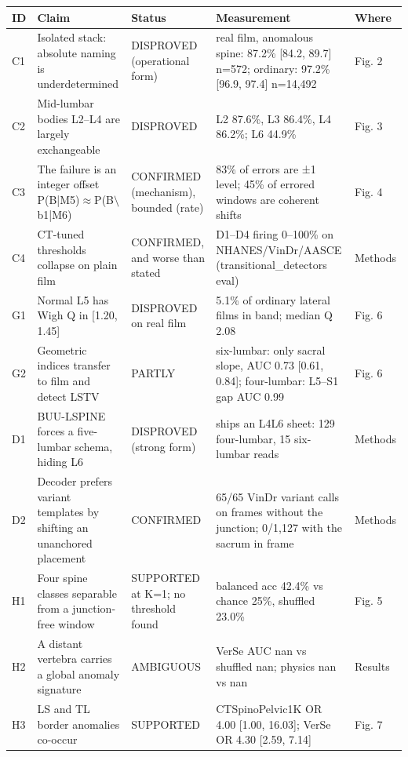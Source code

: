 \begin{tabular}{p{0.6cm}p{4.6cm}p{2.6cm}p{6.2cm}p{1.2cm}}
\toprule
ID & Claim & Status & Measurement & Where \\
\midrule
C1 & Isolated stack: absolute naming is underdetermined & DISPROVED (operational form) & real film, anomalous spine: 87.2\% [84.2, 89.7] n=572; ordinary: 97.2\% [96.9, 97.4] n=14,492 & Fig. 2 \\
C2 & Mid-lumbar bodies L2--L4 are largely exchangeable & DISPROVED & L2 87.6\%, L3 86.4\%, L4 86.2\%; L6 44.9\% & Fig. 3 \\
C3 & The failure is an integer offset P(B|M5)$\approx$P(B$\setminus$b1|M6) & CONFIRMED (mechanism), bounded (rate) & 83\% of errors are ±1 level; 45\% of errored windows are coherent shifts & Fig. 4 \\
C4 & CT-tuned thresholds collapse on plain film & CONFIRMED, and worse than stated & D1--D4 firing 0--100\% on NHANES/VinDr/AASCE (transitional\_detectors eval) & Methods \\
G1 & Normal L5 has Wigh Q in [1.20, 1.45] & DISPROVED on real film & 5.1\% of ordinary lateral films in band; median Q 2.08 & Fig. 6 \\
G2 & Geometric indices transfer to film and detect LSTV & PARTLY & six-lumbar: only sacral slope, AUC 0.73 [0.61, 0.84]; four-lumbar: L5--S1 gap AUC 0.99 & Fig. 6 \\
D1 & BUU-LSPINE forces a five-lumbar schema, hiding L6 & DISPROVED (strong form) & ships an L4L6 sheet: 129 four-lumbar, 15 six-lumbar reads & Methods \\
D2 & Decoder prefers variant templates by shifting an unanchored placement & CONFIRMED & 65/65 VinDr variant calls on frames without the junction; 0/1,127 with the sacrum in frame & Methods \\
H1 & Four spine classes separable from a junction-free window & SUPPORTED at K=1; no threshold found & balanced acc 42.4\% vs chance 25\%, shuffled 23.0\% & Fig. 5 \\
H2 & A distant vertebra carries a global anomaly signature & AMBIGUOUS & VerSe AUC nan vs shuffled nan; physics nan vs nan & Results \\
H3 & LS and TL border anomalies co-occur & SUPPORTED & CTSpinoPelvic1K OR 4.00 [1.00, 16.03]; VerSe OR 4.30 [2.59, 7.14] & Fig. 7 \\
\bottomrule
\end{tabular}
